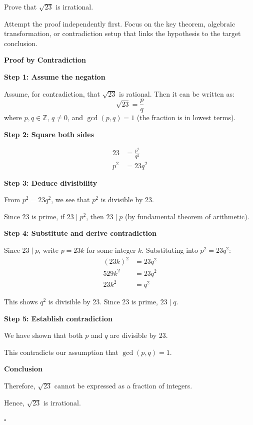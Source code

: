 
\begin{problem}
Prove that $\sqrt{23}$ is irrational.
\end{problem}

\begin{hint}
Attempt the proof independently first. Focus on the key theorem, algebraic transformation, or contradiction setup that links the hypothesis to the target conclusion.
\end{hint}

\begin{solution}
\textbf{Proof by Contradiction}

\textbf{Step 1: Assume the negation}

Assume, for contradiction, that $\sqrt{23}$ is rational. Then it can be written as:
\[ \sqrt{23} = \frac{p}{q} \]
where $p, q \in \mathbb{Z}$, $q \neq 0$, and $\gcd(p,q) = 1$ (the fraction is in lowest terms).

\textbf{Step 2: Square both sides}

\begin{align*}
    23 &= \frac{p^2}{q^2} \\
    p^2 &= 23q^2
\end{align*}

\textbf{Step 3: Deduce divisibility}

From $p^2 = 23q^2$, we see that $p^2$ is divisible by 23.

Since 23 is prime, if $23 \mid p^2$, then $23 \mid p$ (by fundamental theorem of arithmetic).

\textbf{Step 4: Substitute and derive contradiction}

Since $23 \mid p$, write $p = 23k$ for some integer $k$. Substituting into $p^2 = 23q^2$:
\begin{align*}
    (23k)^2 &= 23q^2 \\
    529k^2 &= 23q^2 \\
    23k^2 &= q^2
\end{align*}

This shows $q^2$ is divisible by 23. Since 23 is prime, $23 \mid q$.

\textbf{Step 5: Establish contradiction}

We have shown that both $p$ and $q$ are divisible by 23.

This contradicts our assumption that $\gcd(p,q) = 1$.

\textbf{Conclusion}

Therefore, $\sqrt{23}$ cannot be expressed as a fraction of integers.

Hence, $\sqrt{23}$ is irrational.

\hfill $\square$
\end{solution}

